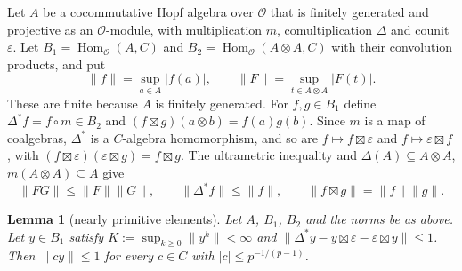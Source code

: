 \documentclass[11pt]{article}
\newtheorem{lemma}[theorem]{Lemma}
\theoremstyle{definition}
\theoremstyle{remark}
\newcommand{\cO}{\mathcal O}
\begin{document}
Let $A$ be a cocommutative Hopf algebra over $\cO$ that is finitely generated and projective as an $\cO$-module, with multiplication $m$, comultiplication $\Delta$ and counit $\varepsilon$. Let $B_1=\operatorname{Hom}_\cO(A,C)$ and $B_2=\operatorname{Hom}_\cO(A\otimes A,C)$ with their convolution products, and put
\[
\lVert f\rVert=\sup_{a\in A}\lvert f(a)\rvert,\qquad\lVert F\rVert=\sup_{t\in A\otimes A}\lvert F(t)\rvert .
\]
These are finite because $A$ is finitely generated. For $f,g\in B_1$ define $\Delta^*f=f\circ m\in B_2$ and $(f\boxtimes g)(a\otimes b)=f(a)g(b)$. Since $m$ is a map of coalgebras, $\Delta^*$ is a $C$-algebra homomorphism, and so are $f\mapsto f\boxtimes\varepsilon$ and $f\mapsto\varepsilon\boxtimes f$, with $(f\boxtimes\varepsilon)(\varepsilon\boxtimes g)=f\boxtimes g$. The ultrametric inequality and $\Delta(A)\subseteq A\otimes A$, $m(A\otimes A)\subseteq A$ give
\begin{equation}\label{eq:norms}
\lVert FG\rVert\le\lVert F\rVert\lVert G\rVert,\qquad\lVert\Delta^*f\rVert\le\lVert f\rVert,\qquad\lVert f\boxtimes g\rVert=\lVert f\rVert\lVert g\rVert .
\end{equation}

\begin{lemma}[nearly primitive elements]\label{lem:np}
Let $A$, $B_1$, $B_2$ and the norms be as above. Let $y\in B_1$ satisfy $K:=\sup_{k\ge0}\lVert y^k\rVert<\infty$ and $\lVert\Delta^*y-y\boxtimes\varepsilon-\varepsilon\boxtimes y\rVert\le1$. Then $\lVert cy\rVert\le1$ for every $c\in C$ with $\lvert c\rvert\le p^{-1/(p-1)}$.
\end{lemma}
\end{document}

